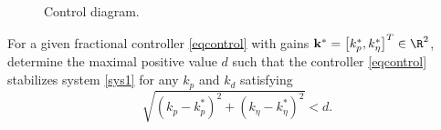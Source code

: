 \documentclass[twoside,reqno,11pt]{fcaa-var} %
\begin{document}
\begin{problem}
\begin{figure}
\begin{adjustbox}{max width=\columnwidth}
		\end{adjustbox}
		\caption{Control diagram.} \label{GCDiagram}
	\end{figure}
\end{problem}
\begin{problem}
	For a given fractional controller \eqref{eqcontrol} with gains $\mathbf{k}^*=\left[k_p^*,k_\eta^*\right]^T\in\R^2$, determine the maximal positive value $d$ such that the 
	controller \eqref{eqcontrol} stabilizes system \eqref{sys1} for any $k_p$ and $k_d$ satisfying
	\begin{equation}
	\sqrt{(k_p-k_p^*)^2+(k_\eta-k_\eta^*)^2}<d.
	\end{equation}
\end{problem}
\smallskip
\end{document}
